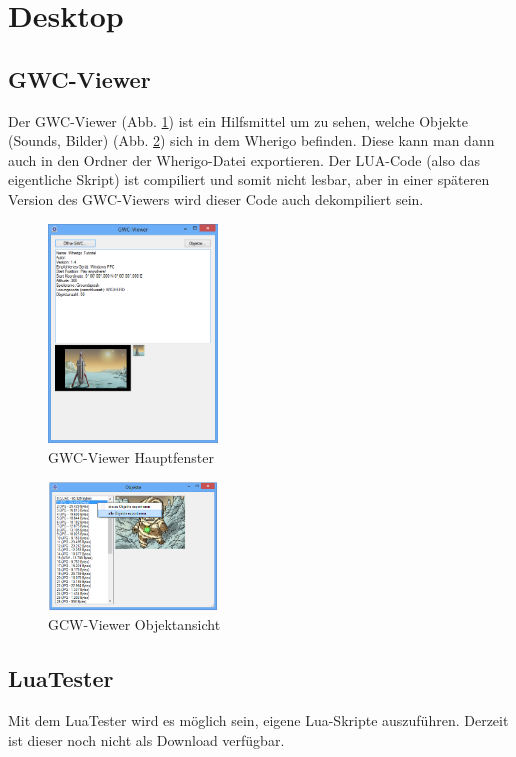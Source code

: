 \section{Desktop}

\subsection{GWC-Viewer}
Der GWC-Viewer (Abb. \ref{viewer_main}) ist ein Hilfsmittel um zu sehen, welche Objekte (Sounds, Bilder) (Abb. \ref{viewer_objects}) sich in dem Wherigo befinden. Diese kann man dann auch in den Ordner der Wherigo-Datei exportieren. Der LUA-Code (also das eigentliche Skript) ist compiliert und somit nicht lesbar, aber in einer späteren Version des GWC-Viewers wird dieser Code auch dekompiliert sein.

\begin{figure}[hb]
\includegraphics[width=0.4\textwidth]{screens/viewer_main}
\caption{GWC-Viewer Hauptfenster}
\label{viewer_main}
\end{figure}

\begin{figure}[hb]
\includegraphics[width=0.4\textwidth]{screens/viewer_objects}
\caption{GCW-Viewer Objektansicht}
\label{viewer_objects}
\end{figure}


\subsection{LuaTester}
Mit dem LuaTester wird es möglich sein, eigene Lua-Skripte auszuführen. Derzeit ist dieser noch nicht als Download verfügbar.
